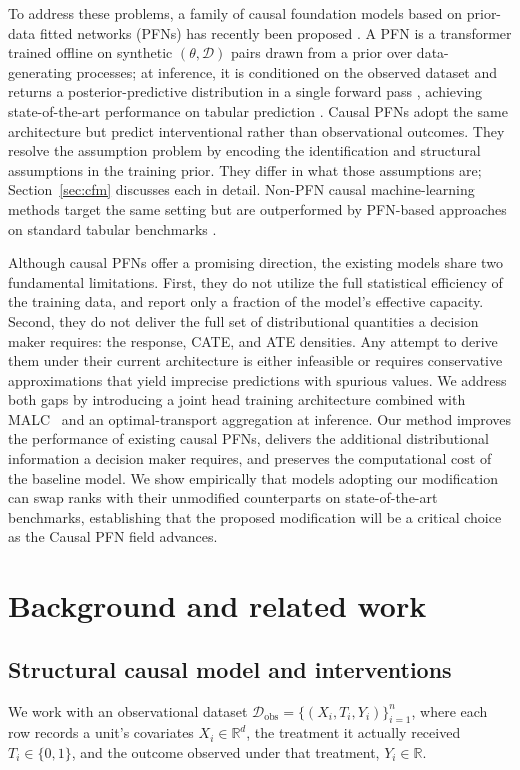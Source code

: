 \documentclass[11pt]{article}
\begin{document}
To address these problems, a family of causal foundation models based on prior-data fitted networks (PFNs) has recently been proposed \citep{dopfn, uwyk, causalpfn, ma2026causalfm}. A PFN is a transformer trained offline on synthetic $(\theta, \mathcal{D})$ pairs drawn from a prior over data-generating processes; at inference, it is conditioned on the observed dataset and returns a posterior-predictive distribution in a single forward pass \citep{muller2022pfn}, achieving state-of-the-art performance on tabular prediction \citep{hollmann2022tabpfn}. Causal PFNs adopt the same architecture but predict interventional rather than observational outcomes. They resolve the assumption problem by encoding the identification and structural assumptions in the training prior. They differ in what those assumptions are; Section~\ref{sec:cfm} discusses each in detail. Non-PFN causal machine-learning methods \citep{chernozhukov2018, wager2018} target the same setting but are outperformed by PFN-based approaches on standard tabular benchmarks \citep{dopfn, causalpfn, uwyk}.

Although causal PFNs offer a promising direction, the existing models share two fundamental limitations. First, they do not utilize the full statistical efficiency of the training data, and report only a fraction of the model's effective capacity. Second, they do not deliver the full set of distributional quantities a decision maker requires: the response, CATE, and ATE densities. Any attempt to derive them under their current architecture is either infeasible or requires conservative approximations that yield imprecise predictions with spurious values. We address both gaps by introducing a joint head training architecture combined with MALC~\citep{danisman2026malc} and an optimal-transport aggregation at inference. Our method improves the performance of existing causal PFNs, delivers the additional distributional information a decision maker requires, and preserves the computational cost of the baseline model. We show empirically that models adopting our modification can swap ranks with their unmodified counterparts on state-of-the-art benchmarks, establishing that the proposed modification will be a critical choice as the Causal PFN field advances.

\section{Background and related work}

\subsection{Structural causal model and interventions}
\label{sec:scm-outcomes}
We work with an observational dataset $\mathcal{D}_{\text{obs}} = \{(X_i, T_i, Y_i)\}_{i=1}^n$, where each row records a unit's covariates $X_i \in \mathbb{R}^d$, the treatment it actually received $T_i \in \{0,1\}$, and the outcome observed under that treatment, $Y_i \in \mathbb{R}$. 
\end{document}
